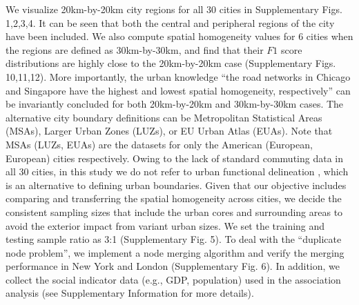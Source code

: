 \documentclass[10pt]{wlscirep}
\begin{document}
We visualize 20km-by-20km city regions for all 30 cities in Supplementary Figs. 1,2,3,4. It can be seen that both the central and peripheral regions of the city have been included. We also compute spatial homogeneity values for 6 cities when the regions are defined as 30km-by-30km, and find that their $F1$ score distributions are highly close to the 20km-by-20km case (Supplementary Figs. 10,11,12). More importantly, the urban knowledge “the road networks in Chicago and Singapore have the highest and lowest spatial homogeneity, respectively” can be invariantly concluded for both 20km-by-20km and 30km-by-30km cases. The alternative city boundary definitions can be Metropolitan Statistical Areas (MSAs)\cite{giacomin2015road}, Larger Urban Zones (LUZs), or EU Urban Atlas (EUAs)\cite{ua2012}. Note that MSAs (LUZs, EUAs) are the datasets for only the American (European, European) cities respectively. Owing to the lack of standard commuting data in all 30 cities, in this study we do not refer to urban functional delineation \cite{shen2019delineating,khiali2019combining, rozenblat2020extending,ma2020functional}, which is an alternative to defining urban boundaries. Given that our objective includes comparing and transferring the spatial homogeneity across cities, we decide the consistent sampling sizes that include the urban cores and surrounding areas to avoid the exterior impact from variant urban sizes. We set the training and testing sample ratio as 3:1 (Supplementary Fig. 5). To deal with the “duplicate node problem”, we implement a node merging algorithm and verify the merging performance in New York and London (Supplementary Fig. 6). In addition, we collect the social indicator data (e.g., GDP, population) used in the association analysis (see Supplementary Information for more details).
\end{document}
